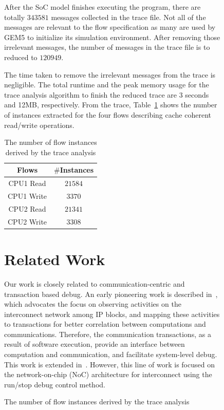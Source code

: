 \documentclass[conference]{IEEEtran}
\begin{document}
\begin{figure}
After the SoC model finishes executing the program, there are totally $343581$ messages collected in the trace file.  Not all of the messages are relevant to the flow specification as many are used by GEM5 to initialize its simulation environment.  After removing those irrelevant messages, the number of messages in the trace file is to reduced to $120949$. 

The time taken to remove the irrelevant messages from the trace is negligible.  The total runtime and the peak memory usage for the trace analysis algorithm to finish the reduced trace are 3 seconds and 12MB, respectively.  From the trace, Table~\ref{table-case-2} shows the number of instances extracted for the four flows describing cache coherent read/write operations. 
\begin{table}[td]
\caption{The number of flow instances derived by the trace analysis}
\begin{center}
\begin{tabular}{|c|c|}
\hline
Flows & $\#$Instances \\
\hline
\hline
CPU1 Read		&  $21584$\\
CPU1 Write	&  $3370$\\
CPU2 Read		&  $21341$\\
CPU2 Write	&  $3308$\\
\hline
\end{tabular}
\end{center}
\label{table-case-2}
\end{table}%



\section{Related Work}

Our work is closely related to communication-centric and transaction based debug.  An early pioneering work is described in~\cite{Goossens2007NOCS}, which advocates the focus on observing activities on the interconnect network among IP blocks, and mapping these activities to transactions for better correlation between computations and communications.  Therefore, the communication transactions, as a result of software execution, provide an interface between computation and communication, and facilitate  system-level debug.  This work is extended in~\cite{Vermeulen2009VLSI-DAT,Goossens2009DATE}.  However, this line of work is focused on the network-on-chip (NoC) architecture for interconnect using the run/stop debug control method.  


\end{figure}
\end{document}
